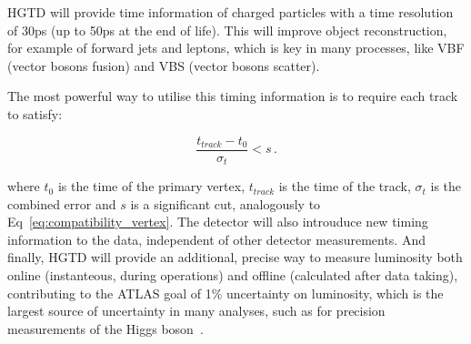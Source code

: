 
HGTD will provide time information of charged particles with a time resolution of 30ps (up to 50ps at the end of life). %
This will improve object reconstruction, for example of forward jets and leptons, which is key in many processes, like VBF (vector bosons fusion) and VBS (vector bosons scatter). %

The most powerful way to utilise this timing information is to require each track to satisfy:

\begin{equation}
    \frac{t_{track}-t_0}{\sigma_t} < s \,.
\end{equation}

where $t_0$ is the time of the primary vertex, $t_{track}$ is the time of the track, $\sigma_t$ is the combined error and $s$ is a significant cut, analogously to Eq~\ref{eq:compatibility_vertex}. %
The detector will also introuduce new timing information to the data, independent of other detector measurements. And finally, HGTD will provide an additional, precise way to measure luminosity both online (instanteous, during operations) and offline (calculated after data taking), contributing to the ATLAS goal of 1\% uncertainty on luminosity, which is the largest source of uncertainty in many analyses, such as for precision measurements of the Higgs boson~\cite{CERN-LHCC-2020-007}.


